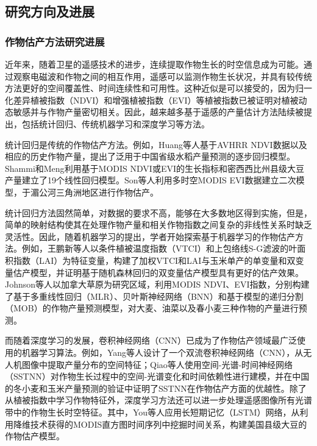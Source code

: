 \subsection{研究方向及进展}

\subsubsection{作物估产方法研究进展}

\par 近年来，随着卫星的遥感技术的进步，连续提取作物生长的时空信息成为可能。通过观察电磁波和作物之间的相互作用\cite{guan2017shared, zhang2003monitoring}，遥感可以监测作物生长状况，并具有较传统方法更好的空间覆盖性、时间连续性和可用性\cite{claverie2013validation}。这种近似是可以接受的，因为归一化差异植被指数（NDVI）和增强植被指数（EVI）等植被指数已被证明对植被动态敏感\cite{sellers1987canopy, tucker1979red}并与作物产量密切相关\cite{shanahan2001use}。因此，越来越多基于遥感的产量估计方法陆续被提出，包括统计回归、传统机器学习和深度学习等方法。

\par 统计回归是传统的作物估产方法。例如，Huang等人\cite{huang2013remotely}基于AVHRR NDVI数据以及相应的历史作物产量，提出了泛用于中国省级水稻产量预测的逐步回归模型。Shammi和Meng\cite{shammi2021use}利用基于MODIS NDVI或EVI的生长指标和密西西比州县级大豆产量建立了19个线性回归模型。Son等人\cite{son2014comparative}利用多时空MODIS EVI数据建立二次模型，于湄公河三角洲地区进行作物估产。

\par 统计回归方法固然简单，对数据的要求不高，能够在大多数地区得到实施，但是，简单的映射结构使其在处理作物产量和相关作物指数之间复杂的非线性关系时缺乏灵活性\cite{balaghi2008empirical, ren2008regional}。因此，随着机器学习的提出，学者开始探索基于机器学习的作物估产方法。例如，王鹏新等人\cite{NYJX201907026}以条件植被温度指数（VTCI）和上包络线S-G滤波的叶面积指数（LAI）为特征变量，构建了加权VTCI和LAI与玉米单产的单变量和双变量估产模型，并证明基于随机森林回归的双变量估产模型具有更好的估产效果。Johnson等人\cite{johnson2016crop}以加拿大草原为研究区域，利用MODIS NDVI、EVI指数，分别构建了基于多重线性回归（MLR）、贝叶斯神经网络（BNN）和基于模型的递归分割（MOB）的作物产量预测模型，对大麦、油菜以及春小麦三种作物的产量进行预测。

\par 而随着深度学习的发展，卷积神经网络（CNN）已成为了作物估产领域最广泛使用的机器学习算法\cite{van2020crop}。例如，Yang等人设计了一个双流卷积神经网络（CNN），从无人机图像中提取产量分布的空间特征\cite{yang2019deep}；Qiao等人使用空间-光谱-时间神经网络（SSTNN）对作物生长过程中的空间-光谱变化和时间依赖性进行建模\cite{qiao2021crop}，并在中国的冬小麦和玉米产量预测的验证中证明了SSTNN在作物估产方面的优越性。除了从植被指数中学习作物特征外，深度学习方法还可以进一步处理遥感图像所有光谱带中的作物生长时空特征。其中，You等人应用长短期记忆（LSTM）网络，从利用降维技术获得的MODIS直方图时间序列中挖掘时间关系，构建美国县级大豆的作物估产模型\cite{you2017deep}。

